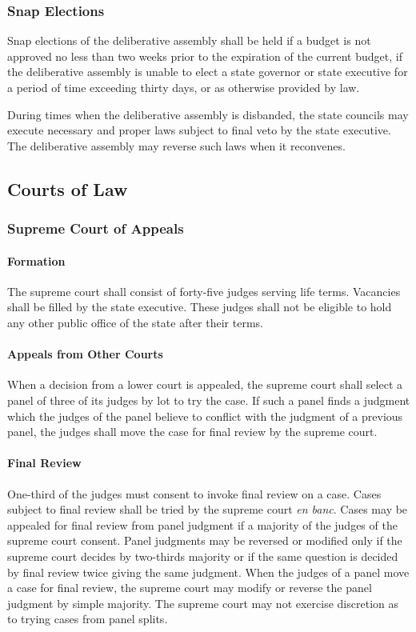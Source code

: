 \documentclass{article}
\begin{document}
\subsubsection{Snap Elections}
Snap elections of the deliberative assembly shall be held if a budget is not approved no less than two weeks prior to the expiration of the current budget, if the deliberative assembly is unable to elect a state governor or state executive for a period of time exceeding thirty days, or as otherwise provided by law.

During times when the deliberative assembly is disbanded, the state councils may execute necessary and proper laws subject to final veto by the state executive. The deliberative assembly may reverse such laws when it reconvenes.
\subsection{Courts of Law}
\subsubsection{Supreme Court of Appeals}
\paragraph{Formation}
The supreme court shall consist of forty-five judges serving life terms. Vacancies shall be filled by the state executive. These judges shall not be eligible to hold any other public office of the state after their terms.
\paragraph{Appeals from Other Courts}
When a decision from a lower court is appealed, the supreme court shall select a panel of three of its judges by lot to try the case. If such a panel finds a judgment which the judges of the panel believe to conflict with the judgment of a previous panel, the judges shall move the case for final review by the supreme court.
\paragraph{Final Review}
One-third of the judges must consent to invoke final review on a case. Cases subject to final review shall be tried by the supreme court \textit{en banc}. Cases may be appealed for final review from panel judgment if a majority of the judges of the supreme court consent. Panel judgments may be reversed or modified only if the supreme court decides by two-thirds majority or if the same question is decided by final review twice giving the same judgment. When the judges of a panel move a case for final review, the supreme court may modify or reverse the panel judgment by simple majority. The supreme court may not exercise discretion as to trying cases from panel splits.
\end{document}
